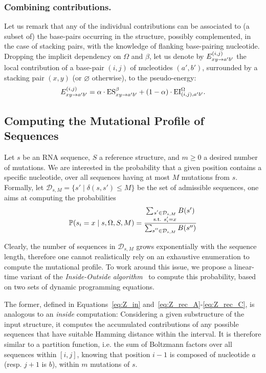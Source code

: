 \subsubsection{Combining contributions.}
Let us remark that any of the individual contributions can be associated to (a subset of) the base-pairs occurring in the structure, possibly complemented, in the case of stacking pairs, with the knowledge of flanking base-pairing nucleotide.
Dropping the implicit dependency on $\Omega$ and $\beta$, let us denote by $E^{(i,j)}_{{xy}\to{a'b'}}$ the local contribution of a base-pair $(i,j)$ of nucleotides $(a',b')$, surrounded by a stacking pair $(x,y)$ (or $\varnothing$ otherwise), to the pseudo-energy:
\begin{equation}
  E^{(i,j)}_{{xy}\to{a'b'}}  = \alpha \cdot\text{ES}^\beta_{xy \to a' b'}+(1-\alpha)\cdot\text{EI}^{\Omega}_{(i,j),a'b'}.
\end{equation}

\subsection{Computing the Mutational Profile of Sequences}


Let $s$ be an RNA sequence, $S$ a reference structure, and $m\geq 0$ a desired number of mutations. 
We are interested in  the probability that a given position contains a specific nucleotide, over all sequences having at most $M$ mutations from $s$. Formally, let $\mathcal{D}_{s,M}=\{s'\;|\;\delta(s,s')\le M\}$ be the set of admissible sequences, one aims at computing the probabilities
\begin{equation}
\mathbb{P}(s_i = x\mid s,\Omega, S,M) = \frac{\sum_{\substack{s'\in\mathcal{D}_{s,M}\\\text{s.t. }s'_{i}=x}}B(s')}{\sum_{\substack{s''\in\mathcal{D}_{s,M}}}B(s'')}
\end{equation}

 
Clearly, the number of sequences in $\mathcal{D}_{s,M}$ grows exponentially with the sequence length, therefore one cannot realistically rely on an exhaustive enumeration to compute the mutational profile. To work around this issue, we propose a linear-time variant of the
 \emph{Inside-Outside algorithm}~\citep{Lari1990} to compute this probability, based on two sets of dynamic programming equations. 

The former, defined in Equations~\eqref{eq:Z_in} and~\eqref{eq:Z_rec_A}-\eqref{eq:Z_rec_C}, is analogous to an \emph{inside} computation: Considering a given substructure of the input structure, it computes the accumulated contributions of any possible sequences that have suitable Hamming distance within the interval. It is therefore similar to a partition function, i.e. the sum of Boltzmann factors over all sequences within $[i,j]$, 
knowing that position $i-1$ is composed of nucleotide $a$ (resp. $j+1$ is $b$), within 
$m$ mutations of $s$. 

